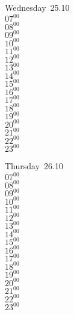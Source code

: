 \documentclass[11pt, a4paper]{book}\usepackage[]{graphicx}\usepackage[]{color}
\begin{document}
\begin{weekdaybox}
  Wednesday~25.10\\
  { 
  \vfill
  $07^{00}$\\
$08^{00}$\\
$09^{00}$\\
$10^{00}$\\
$11^{00}$\\
$12^{00}$\\
$13^{00}$\\
$14^{00}$\\
$15^{00}$\\
$16^{00}$\\
$17^{00}$\\
$18^{00}$\\
$19^{00}$\\
$20^{00}$\\
$21^{00}$\\
$22^{00}$\\
$23^{00}$\\
  }
\end{weekdaybox}
\clearpage
\begin{headerbox}
\end{headerbox}
\begin{weekdaybox}
  Thursday~26.10\\
  { 
  \vfill
  $07^{00}$\\
$08^{00}$\\
$09^{00}$\\
$10^{00}$\\
$11^{00}$\\
$12^{00}$\\
$13^{00}$\\
$14^{00}$\\
$15^{00}$\\
$16^{00}$\\
$17^{00}$\\
$18^{00}$\\
$19^{00}$\\
$20^{00}$\\
$21^{00}$\\
$22^{00}$\\
$23^{00}$\\
  }
\end{weekdaybox} 
\end{document}
